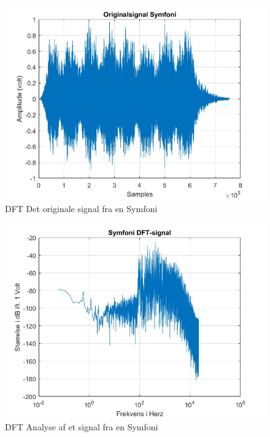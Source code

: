 \begin{figure}[ht!]
	\centering
	\includegraphics[width=180mm]{figures/Symfoni/original.jpg}
	\caption{DFT Det originale signal fra en Symfoni}
	\label{fig:Symfoni original}
\end{figure}

\begin{figure}[ht!]
	\centering
	\includegraphics[width=180mm]{figures/Symfoni/DFT.jpg}
	\caption{DFT Analyse af et signal fra en Symfoni}
	\label{fig:Symfoni DFT}
\end{figure}

